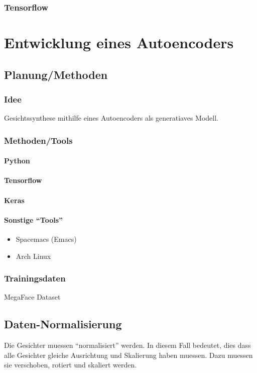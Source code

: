 \subsection{Tensorflow}


\chapter{Entwicklung eines Autoencoders}

\section{Planung/Methoden}

\subsection{Idee}
Gesichtssynthese mithilfe eines Autoencoders als generatiaves Modell.

\subsection{Methoden/Tools}

\subsubsection{Python}
\subsubsection{Tensorflow}
\subsubsection{Keras}
\subsubsection{Sonstige ``Tools''}
\begin{itemize}
\item{Spacemacs (Emacs)}
\item{Arch Linux}
\end{itemize}

\subsection{Trainingsdaten}
MegaFace Dataset

\section{Daten-Normalisierung}
Die Gesichter muessen ``normalisiert'' werden. In diesem Fall bedeutet, dies
dass alle Gesichter gleiche Ausrichtung und Skalierung haben muessen. Dazu
muessen sie verschoben, rotiert und skaliert werden.

